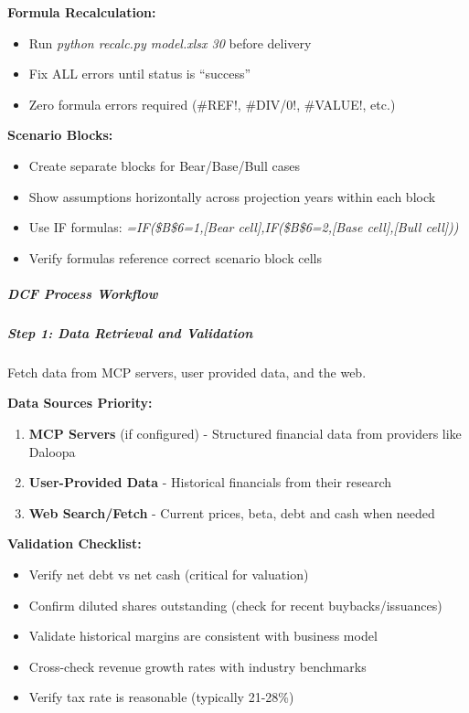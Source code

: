 \documentclass[11pt]{article}
\begin{document}
\textbf{Formula Recalculation:}

\begin{itemize}[leftmargin=*,itemsep=2pt,topsep=2pt]
\item {} Run \emph{python recalc.py model.xlsx 30} before delivery
\item {} Fix ALL errors until status is ``success''
\item {} Zero formula errors required (\#REF!, \#DIV/0!, \#VALUE!, etc.)
\end{itemize}

\textbf{Scenario Blocks:}

\begin{itemize}[leftmargin=*,itemsep=2pt,topsep=2pt]
\item {} Create separate blocks for Bear/Base/Bull cases
\item {} Show assumptions horizontally across projection years within each block
\item {} Use IF formulas: \emph{=IF(\$B\$6=1,[Bear cell],IF(\$B\$6=2,[Base cell],[Bull cell]))}
\item {} Verify formulas reference correct scenario block cells
\end{itemize}

\subparagraph{DCF Process Workflow}\mbox{}\par

\subparagraph{Step 1: Data Retrieval and Validation}\mbox{}\par

Fetch data from MCP servers, user provided data, and the web.


\textbf{Data Sources Priority:}

\begin{enumerate}[leftmargin=*,itemsep=2pt,topsep=2pt]
\item {} \textbf{MCP Servers} (if configured) - Structured financial data from providers like Daloopa
\item {} \textbf{User-Provided Data} - Historical financials from their research
\item {} \textbf{Web Search/Fetch} - Current prices, beta, debt and cash when needed
\end{enumerate}

\textbf{Validation Checklist:}

\begin{itemize}[leftmargin=*,itemsep=2pt,topsep=2pt]
\item {} Verify net debt vs net cash (critical for valuation)
\item {} Confirm diluted shares outstanding (check for recent buybacks/issuances)
\item {} Validate historical margins are consistent with business model
\item {} Cross-check revenue growth rates with industry benchmarks
\item {} Verify tax rate is reasonable (typically 21-28\%)
\end{itemize}
\end{document}
